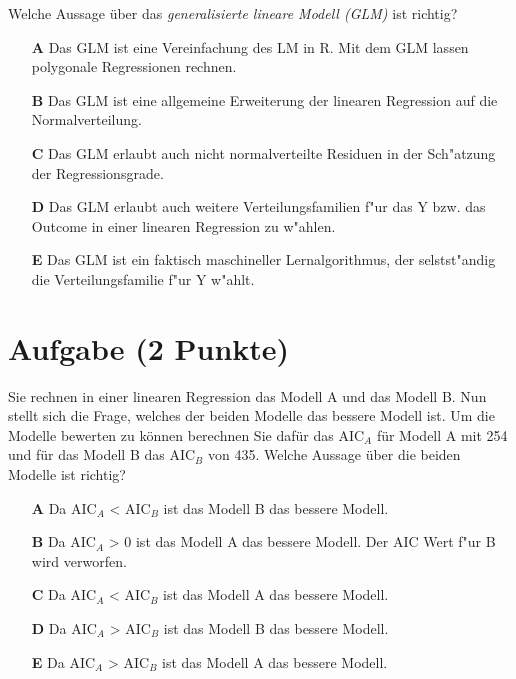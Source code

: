 \documentclass[a4paper, 10pt]{scrartcl}\usepackage[]{graphicx}\usepackage[]{color}
\begin{document}
Welche Aussage {\"u}ber das \textit{generalisierte lineare Modell (GLM)} ist richtig?  



\begin{enumerate}
\item [\textbf{A} \msquare] Das GLM ist eine Vereinfachung des LM in R. Mit dem GLM lassen polygonale Regressionen rechnen.
\item [\textbf{B} \msquare] Das GLM ist eine allgemeine Erweiterung der linearen Regression auf die Normalverteilung.
\item [\textbf{C} \msquare] Das GLM erlaubt auch nicht normalverteilte Residuen in der Sch{"a}tzung der Regressionsgrade.
\item [\textbf{D} \msquare] Das GLM erlaubt auch weitere Verteilungsfamilien f{"u}r das Y bzw. das Outcome in einer linearen Regression zu w{"a}hlen.
\item [\textbf{E} \msquare] Das GLM ist ein faktisch maschineller Lernalgorithmus, der selstst{"a}ndig die Verteilungsfamilie f{"u}r Y w{"a}hlt.
\end{enumerate}

\section{Aufgabe \hfill (2 Punkte)}



Sie rechnen in einer linearen Regression das Modell A und das Modell B. Nun
stellt sich die Frage, welches der beiden Modelle das bessere Modell
ist. Um die Modelle bewerten zu k{\"o}nnen berechnen Sie daf{\"u}r das AIC$_A$ f{\"u}r
Modell A mit 254 und f{\"u}r das Modell B das AIC$_B$ von
435. Welche Aussage {\"u}ber die beiden Modelle ist richtig?



\begin{enumerate}
\item [\textbf{A} \msquare] Da AIC$_A$ < AIC$_B$ ist das Modell B das bessere Modell.
\item [\textbf{B} \msquare] Da AIC$_A$ > 0 ist das Modell A das bessere Modell. Der AIC Wert f{"u}r B wird verworfen.
\item [\textbf{C} \msquare] Da AIC$_A$ < AIC$_B$ ist das Modell A das bessere Modell.
\item [\textbf{D} \msquare] Da AIC$_A$ > AIC$_B$ ist das Modell B das bessere Modell.
\item [\textbf{E} \msquare] Da AIC$_A$ > AIC$_B$ ist das Modell A das bessere Modell.
\end{enumerate}
\end{document}
